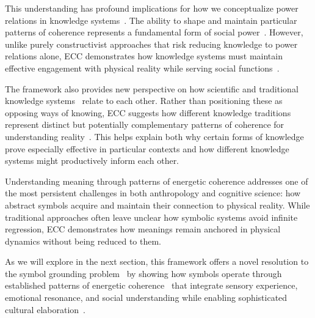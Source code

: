 This understanding has profound implications for how we conceptualize power relations in knowledge systems~. The ability to shape and maintain particular patterns of coherence represents a fundamental form of social power~\cite{foucault1980power}. However, unlike purely constructivist approaches that risk reducing knowledge to power relations alone, ECC demonstrates how knowledge systems must maintain effective engagement with physical reality while serving social functions~\cite{scott1998seeing}.

The framework also provides new perspective on how scientific and traditional knowledge systems~ relate to each other. Rather than positioning these as opposing ways of knowing, ECC suggests how different knowledge traditions represent distinct but potentially complementary patterns of coherence for understanding reality~\cite{latour1999pandora}. This helps explain both why certain forms of knowledge prove especially effective in particular contexts and how different knowledge systems might productively inform each other.

Understanding meaning through patterns of energetic coherence addresses one of the most persistent challenges in both anthropology and cognitive science: how abstract symbols acquire and maintain their connection to physical reality. While traditional approaches often leave unclear how symbolic systems avoid infinite regression, ECC demonstrates how meanings remain anchored in physical dynamics without being reduced to them.

As we will explore in the next section, this framework offers a novel resolution to the symbol grounding problem~ by showing how symbols operate through established patterns of energetic coherence~ that integrate sensory experience, emotional resonance, and social understanding while enabling sophisticated cultural elaboration~\cite{harnad1990symbol,csordas1990embodiment}.
